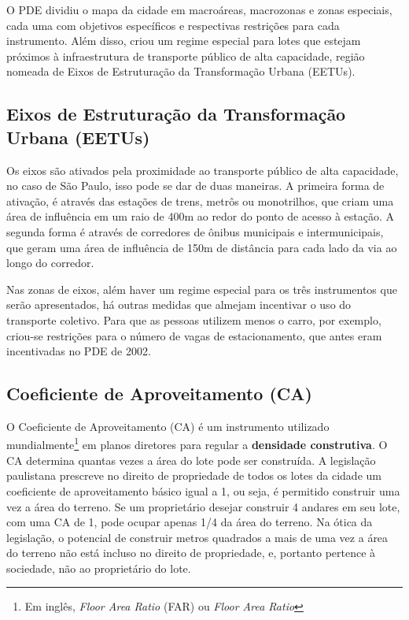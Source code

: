 O PDE dividiu o mapa da cidade em macroáreas, macrozonas e zonas especiais, cada uma com objetivos específicos e respectivas restrições para cada instrumento. Além disso, criou um regime especial para lotes que estejam próximos à infraestrutura de transporte público de alta capacidade, região nomeada de Eixos de Estruturação da Transformação Urbana (EETUs). 

\subsection*{Eixos de Estruturação da Transformação Urbana (EETUs)}

Os eixos são ativados pela proximidade ao transporte público de alta capacidade, no caso de São Paulo, isso pode se dar de duas maneiras. A primeira forma de ativação, é através das estações de trens, metrôs ou monotrilhos, que criam uma área de influência em um raio de 400m ao redor do ponto de acesso à estação. A segunda forma é através de corredores de ônibus municipais e intermunicipais, que geram uma área de influência de 150m de distância para cada lado da via ao longo do corredor.

Nas zonas de eixos, além haver um regime especial para os três instrumentos que serão apresentados, há outras medidas que almejam incentivar o uso do transporte coletivo. Para que as pessoas utilizem menos o carro, por exemplo, criou-se restrições para o número de vagas de estacionamento, que antes eram incentivadas no PDE de 2002.

\subsection*{Coeficiente de Aproveitamento (CA)}

O Coeficiente de Aproveitamento (CA) é um instrumento utilizado mundialmente\footnote{Em inglês, \textit{Floor Area Ratio} (FAR) ou \textit{Floor Area Ratio}} em planos diretores para regular a \textbf{densidade construtiva}. O CA determina quantas vezes a área do lote pode ser construída. A legislação paulistana prescreve no direito de propriedade de todos os lotes da cidade um coeficiente de aproveitamento básico igual a 1, ou seja, é permitido construir uma vez a área do terreno. Se um proprietário desejar construir 4 andares em seu lote, com uma CA de 1, pode ocupar apenas 1/4 da área do terreno. Na ótica da legislação, o potencial de construir metros quadrados a mais de uma vez a área do terreno não está incluso no direito de propriedade, e, portanto pertence à sociedade, não ao proprietário do lote.

